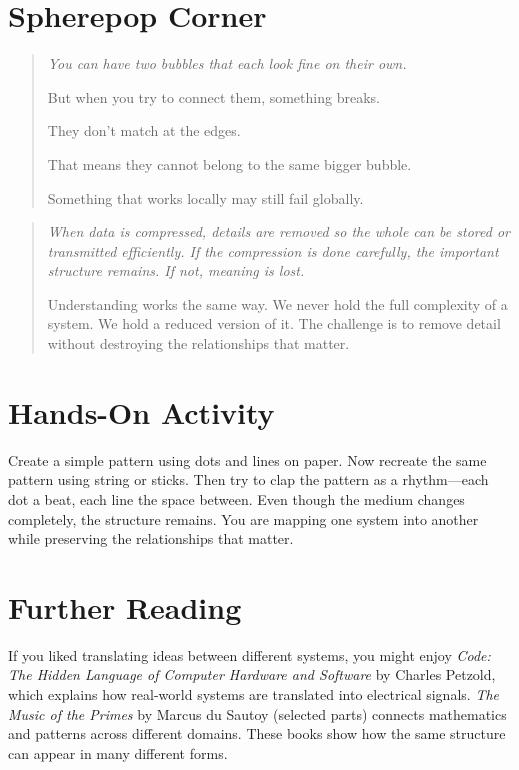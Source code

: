 \documentclass[11pt]{book}
\theoremstyle{definition}
\theoremstyle{remark}
\newenvironment{literaryaside}
  {\begin{quote}\small\itshape}
  {\end{quote}}
\newenvironment{spherepopjunior}
  {\begin{quote}\small\itshape}
  {\end{quote}}
\begin{document}
\section*{Spherepop Corner}

\begin{spherepopjunior}
You can have two bubbles that each look fine on their own.

But when you try to connect them, something breaks.

They don't match at the edges.

That means they cannot belong to the same bigger bubble.

Something that works locally may still fail globally.
\end{spherepopjunior}

\begin{literaryaside}
When data is compressed, details are removed so the whole can be stored
or transmitted efficiently. If the compression is done carefully, the
important structure remains. If not, meaning is lost.

Understanding works the same way. We never hold the full complexity of
a system. We hold a reduced version of it. The challenge is to remove
detail without destroying the relationships that matter.
\end{literaryaside}

\section*{Hands-On Activity}

Create a simple pattern using dots and lines on paper. Now recreate
the same pattern using string or sticks. Then try to clap the pattern
as a rhythm---each dot a beat, each line the space between. Even though
the medium changes completely, the structure remains. You are mapping
one system into another while preserving the relationships that matter.

\section*{Further Reading}

If you liked translating ideas between different systems, you might
enjoy \textit{Code: The Hidden Language of Computer Hardware and
Software} by Charles Petzold, which explains how real-world systems
are translated into electrical signals. \textit{The Music of the
Primes} by Marcus du Sautoy (selected parts) connects mathematics and
patterns across different domains. These books show how the same
structure can appear in many different forms.
\end{document}
